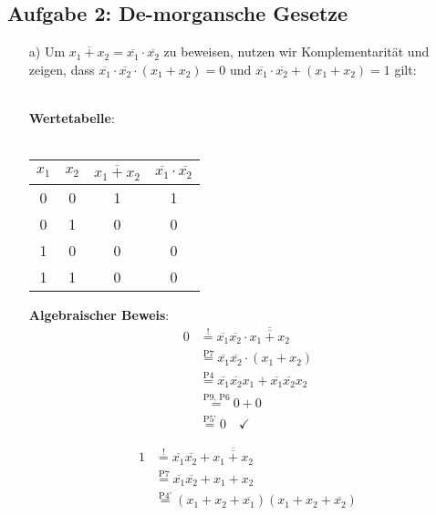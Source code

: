 \documentclass{article}
\newcommand{\nyet}{\overline}
\begin{document}
	\subsection*{Aufgabe 2: De-morgansche Gesetze}
	\begin{enumerate}
		\item[a)] Um $\overline{x_1 + x_2} = \overline{x_1} \cdot \overline{x_2}$ zu beweisen, nutzen wir Komplementarität und zeigen, dass $\overline{x_1} \cdot \overline{x_2} \cdot (x_1 + x_2) = 0$ und $\overline{x_1} \cdot \overline{x_2} + (x_1 + x_2) = 1$ gilt:\\\\
		\begin{minipage}[t]{0.27\textwidth}
			\textbf{Wertetabelle}:\\\\
			\begin{tabular}[t]{cc|cc}
				$x_1$ & $x_2$ & $\nyet{x_1 + x_2}$ & $ \nyet{x_1} \cdot \nyet{x_2}$ \\ \hline
				0 & 0 & 1 & 1 \\
				0 & 1 & 0 & 0 \\
				1 & 0 & 0 & 0 \\
				1 & 1 & 0 & 0
			\end{tabular}
		\end{minipage}
		\begin{minipage}[t]{0.35\textwidth}
			\textbf{Algebraischer Beweis}: 
			\begin{align*}
				0 &\stackrel{!}{=} \nyet{x_1} \nyet{x_2} \cdot \nyet{\nyet{x_1 + x_2}} \\
				&\stackrel{\text{P7}}{=} \nyet{x_1} \nyet{x_2} \cdot (x_1 + x_2) \\
				&\stackrel{\text{P4}}{=} \nyet{x_1} \nyet{x_2} x_1 + \nyet{x_1} \nyet{x_2} x_2 \\
				&\stackrel{\text{P9, P6}}{=} 0 + 0 \\
				&\stackrel{\text{P5'}}{=} 0 \quad \checkmark
			\end{align*}
		\end{minipage}
		\begin{minipage}[t]{0.3\textwidth}
			\vspace{0.3em}
			\begin{align*}
				1 &\stackrel{!}{=} \nyet{x_1} \nyet{x_2} + \nyet{\nyet{x_1 + x_2}} \\
				&\stackrel{\text{P7}}{=} \nyet{x_1} \nyet{x_2} + x_1 + x_2 \\
				&\stackrel{\text{P4'}}{=} (x_1 + x_2 + \nyet{x_1})(x_1 + x_2 + \nyet{x_2}) \\

\end{align*}
\end{minipage}
\end{enumerate}
\end{document}
